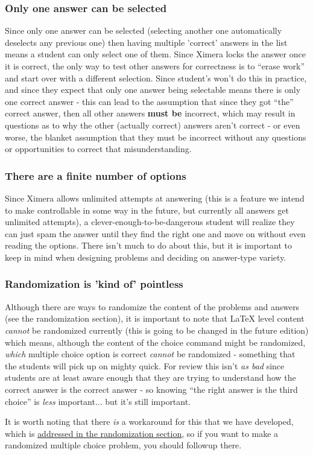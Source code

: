 \documentclass{ximera}
\begin{document}
        \subsubsection*{Only one answer can be selected}
            Since only one answer can be selected (selecting another one automatically deselects any previous one) then having multiple 'correct' answers in the list means a student can only select one of them. Since Ximera locks the answer once it is correct, the only way to test other answers for correctness is to ``erase work'' and start over with a different selection. Since student's won't do this in practice, and since they expect that only one answer being selectable means there is only one correct answer - this can lead to the assumption that since they got ``the'' correct answer, then all other answers \textbf{must be} incorrect, which may result in questions as to why the other (actually correct) answers aren't correct - or even worse, the blanket assumption that they must be incorrect without any questions or opportunities to correct that misunderstanding.
            
        \subsubsection*{There are a finite number of options}
            Since Ximera allows unlimited attempts at answering (this is a feature we intend to make controllable in some way in the future, but currently all answers get unlimited attempts), a clever-enough-to-be-dangerous student will realize they can just spam the answer until they find the right one and move on without even reading the options. There isn't much to do about this, but it is important to keep in mind when designing problems and deciding on answer-type variety.
            
        \subsubsection*{Randomization is 'kind of' pointless}
            Although there are ways to randomize the content of the problems and answers (see the randomization section), it is important to note that LaTeX level content \textit{cannot} be randomized currently (this is going to be changed in the future edition) which means, although the content of the choice command might be randomized, \textit{which} multiple choice option is correct \textit{cannot} be randomized - something that the students will pick up on mighty quick. For review this isn't \textit{as bad} since students are at least aware enough that they are trying to understand how the correct answer is the correct answer - so knowing ``the right answer is the third choice'' is \textit{less} important... but it's still important.
            
            It is worth noting that there \textit{is} a workaround for this that we have developed, which is \href{https://xronos.clas.ufl.edu/examples/exampleCore/problemDesign/multipleChoice}{addressed in the randomization section}, so if you want to make a randomized multiple choice problem, you should followup there.
            
        
    
\end{document}
